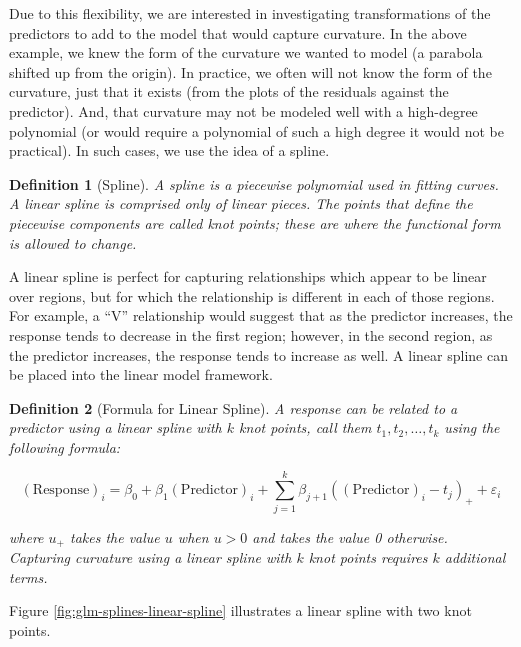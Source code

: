 \documentclass[
]{book}
\theoremstyle{plain}
\theoremstyle{mydefn}
\newtheorem{definition}{Definition}[chapter]
\theoremstyle{myexmpl}
\theoremstyle{remark}
\begin{document}
Due to this flexibility, we are interested in investigating transformations of the predictors to add to the model that would capture curvature. In the above example, we knew the form of the curvature we wanted to model (a parabola shifted up from the origin). In practice, we often will not know the form of the curvature, just that it exists (from the plots of the residuals against the predictor). And, that curvature may not be modeled well with a high-degree polynomial (or would require a polynomial of such a high degree it would not be practical). In such cases, we use the idea of a spline.

\begin{definition}[Spline]
A spline is a piecewise polynomial used in fitting curves. A \emph{linear} spline is comprised only of linear pieces. The points that define the piecewise components are called \emph{knot points}; these are where the functional form is allowed to change.
\end{definition}

A linear spline is perfect for capturing relationships which appear to be linear over regions, but for which the relationship is different in each of those regions. For example, a ``V'' relationship would suggest that as the predictor increases, the response tends to decrease in the first region; however, in the second region, as the predictor increases, the response tends to increase as well. A linear spline can be placed into the linear model framework.

\begin{definition}[Formula for Linear Spline]
A response can be related to a predictor using a linear spline with \(k\) knot points, call them \(t_1, t_2, \dotsc, t_k\) using the following formula:

\[(\text{Response})_i = \beta_0 + \beta_1 (\text{Predictor})_i + \sum_{j=1}^{k} \beta_{j+1} \left((\text{Predictor})_i - t_j\right)_{+} + \varepsilon_i\]

where \(u_{+}\) takes the value \(u\) when \(u > 0\) and takes the value 0 otherwise. Capturing curvature using a linear spline with \(k\) knot points requires \(k\) additional terms.
\end{definition}

Figure \ref{fig:glm-splines-linear-spline} illustrates a linear spline with two knot points.
\end{document}

